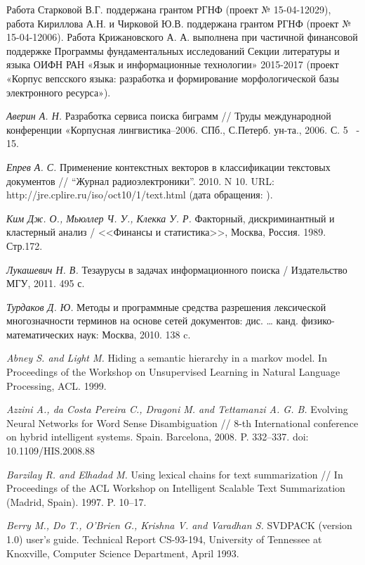 \documentclass{article}
\begin{document}
\begin{articletext}
Работа Старковой В.Г. поддержана грантом РГНФ (проект № 15-04-12029), работа Кириллова А.Н. и Чирковой Ю.В. поддержана грантом РГНФ (проект № 15-04-12006). Работа Крижановского А. А. выполнена при частичной финансовой поддержке Программы фундаментальных исследований Секции литературы и языка ОИФН РАН «Язык  и информационные технологии» 2015-2017 (проект «Корпус вепсского языка: разработка и формирование морфологической базы электронного ресурса»).
 
\begin{thebibliography}{9}

\textit{Аверин А. Н.} Разработка сервиса поиска биграмм // Труды международной конференции «Корпусная лингвистика–2006. СПб., С.Петерб. ун-та., 2006. С. 5~ - 15.

\textit{Епрев А. С.} Применение контекстных векторов в классификации текстовых документов // 
“Журнал радиоэлектроники”.   2010. N 10. URL: http://jre.cplire.ru/iso/oct10/1/text.html (дата обращения: ).

\textit{Ким Дж. О., Мьюллер Ч. У., Клекка У. Р.} Факторный, дискриминантный и кластерный анализ / <<Финансы и статистика>>, Москва, Россия. 1989. Стр.172.

\textit{Лукашевич Н. В.} Тезаурусы в задачах информационного поиска / Издательство МГУ, 2011. 495 с.

\textit{Турдаков Д. Ю.} Методы и программные средства разрешения лексической многозначности терминов на основе сетей документов: дис. … канд. физико-математических наук:  Москва, 2010.  138 c.

\textit{Abney S. and Light M.} Hiding a semantic hierarchy in a markov model. In Proceedings of the Workshop on Unsupervised Learning in Natural Language Processing, ACL. 1999.

\textit{Azzini A., da Costa Pereira C., Dragoni M. and Tettamanzi A. G. B.} Evolving Neural Networks for Word Sense Disambiguation // 8-th International conference on hybrid intelligent systems. Spain. Barcelona, 2008. P. 332–337. doi: 10.1109/HIS.2008.88

\textit{Barzilay R. and  Elhadad M. }Using lexical chains for text summarization // In Proceedings of the ACL Workshop on Intelligent Scalable Text Summarization (Madrid, Spain). 1997. P. 10–17.

\textit{Berry M.,  Do T.,  O’Brien G.,  Krishna V. and Varadhan S. }SVDPACK (version 1.0) user’s guide. Technical Report CS-93-194, University of Tennessee at Knoxville, Computer Science Department, April 1993.


\end{thebibliography}
\end{articletext}
\end{document}
